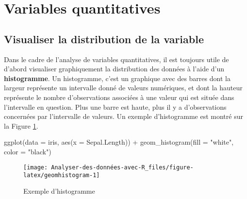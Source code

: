 \documentclass[
]{book}
\newenvironment{Shaded}{\begin{snugshade}}{\end{snugshade}}
\newcommand{\AttributeTok}[1]{\textcolor[rgb]{0.77,0.63,0.00}{#1}}
\newcommand{\FunctionTok}[1]{\textcolor[rgb]{0.00,0.00,0.00}{#1}}
\newcommand{\NormalTok}[1]{#1}
\newcommand{\SpecialCharTok}[1]{\textcolor[rgb]{0.00,0.00,0.00}{#1}}
\newcommand{\StringTok}[1]{\textcolor[rgb]{0.31,0.60,0.02}{#1}}
\begin{document}
\hypertarget{variables-quantitatives}{%
\section{Variables quantitatives}\label{variables-quantitatives}}

\hypertarget{visualiser-la-distribution-de-la-variable}{%
\subsection{Visualiser la distribution de la variable}\label{visualiser-la-distribution-de-la-variable}}

Dans le cadre de l'analyse de variables quantitatives, il est toujours utile de d'abord visualiser graphiquement la distribution des données à l'aide d'un \textbf{histogramme}. Un histogramme, c'est un graphique avec des barres dont la largeur représente un intervalle donné de valeurs numériques, et dont la hauteur représente le nombre d'observations associées à une valeur qui est située dans l'intervalle en question. Plus une barre est haute, plus il y a d'observations concernées par l'intervalle de valeurs. Un exemple d'histogramme est montré sur la Figure \ref{fig:geomhistogram}.

\begin{Shaded}
\begin{Highlighting}[]
\FunctionTok{ggplot}\NormalTok{(}\AttributeTok{data =}\NormalTok{ iris, }\FunctionTok{aes}\NormalTok{(}\AttributeTok{x =}\NormalTok{ Sepal.Length)) }\SpecialCharTok{+} 
  \FunctionTok{geom\_histogram}\NormalTok{(}\AttributeTok{fill =} \StringTok{"white"}\NormalTok{, }\AttributeTok{color =} \StringTok{"black"}\NormalTok{)}
\end{Highlighting}
\end{Shaded}

\begin{figure}

{\centering \texttt{[image: Analyser-des-données-avec-R\_files/figure-latex/geomhistogram-1]} 

}

\caption{Exemple d'histogramme}\label{fig:geomhistogram}
\end{figure}
\end{document}
